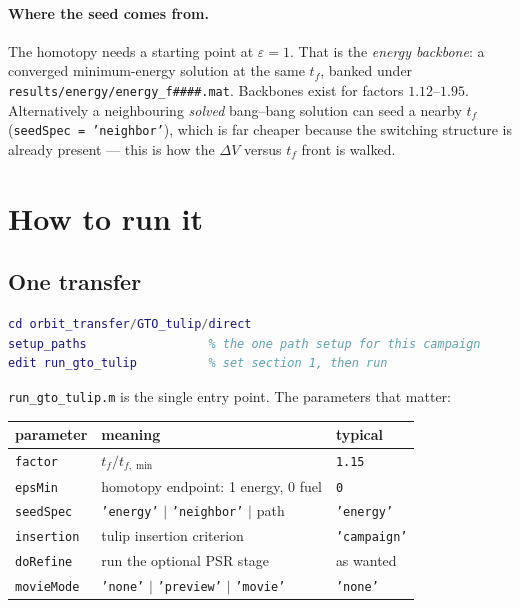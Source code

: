 \documentclass[11pt]{article}
\newcommand{\file}[1]{\texttt{#1}}
\begin{document}
\paragraph{Where the seed comes from.} The homotopy needs a starting point at
$\varepsilon=1$. That is the \emph{energy backbone}: a converged minimum-energy
solution at the same $t_f$, banked under
\file{results/energy/energy\_f\#\#\#\#.mat}. Backbones exist for factors
$1.12$--$1.95$. Alternatively a neighbouring \emph{solved} bang--bang solution
can seed a nearby $t_f$ (\texttt{seedSpec = 'neighbor'}), which is far cheaper
because the switching structure is already present --- this is how the
$\Delta V$ versus $t_f$ front is walked.

\section{How to run it}

\subsection{One transfer}

\begin{lstlisting}[language=Matlab]
cd orbit_transfer/GTO_tulip/direct
setup_paths                 % the one path setup for this campaign
edit run_gto_tulip          % set section 1, then run
\end{lstlisting}

\file{run\_gto\_tulip.m} is the single entry point. The parameters that matter:

\begin{center}
\begin{tabular}{lll}
\toprule
parameter & meaning & typical \\
\midrule
\texttt{factor}   & $t_f/t_{f,\min}$                       & \texttt{1.15} \\
\texttt{epsMin}   & homotopy endpoint: 1 energy, 0 fuel     & \texttt{0} \\
\texttt{seedSpec} & \texttt{'energy'} $\mid$ \texttt{'neighbor'} $\mid$ path & \texttt{'energy'} \\
\texttt{insertion}& tulip insertion criterion               & \texttt{'campaign'} \\
\texttt{doRefine} & run the optional PSR stage              & as wanted \\
\texttt{movieMode}& \texttt{'none'} $\mid$ \texttt{'preview'} $\mid$ \texttt{'movie'} & \texttt{'none'} \\
\bottomrule
\end{tabular}
\end{center}
\end{document}
